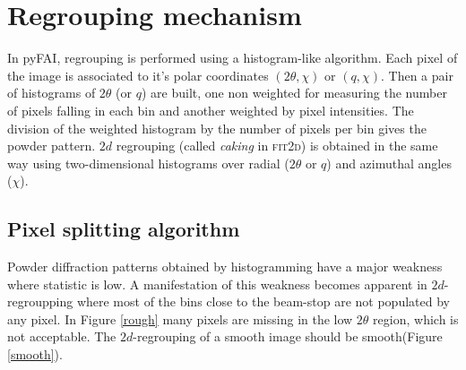 \documentclass[a4paper]{jpconf}
\begin{document}
\section{Regrouping mechanism}
In pyFAI, regrouping is performed using a histogram-like algorithm. 
Each pixel of the image is associated to it's polar coordinates
$(2\theta , \chi )$ or $(q, \chi )$. Then a pair of histograms of $2\theta$
(or $q$) are built, one non weighted for measuring the number of pixels falling in each bin and
another weighted by pixel intensities.
The division of the weighted histogram by the number of pixels per bin gives
the powder pattern.
$2d$ regrouping (called \textit{caking} in \textsc{fit2d}) is obtained in the
same way using two-dimensional histograms over radial ($2\theta$ or $q$) and azimuthal angles
($\chi$).

\subsection{Pixel splitting algorithm}
Powder diffraction patterns obtained by histogramming have a major weakness where
statistic is low.
A manifestation of this weakness becomes apparent in $2d$-regroupping where most of
the bins close to the beam-stop are not populated by any pixel.
In Figure \ref{rough} many pixels are missing in the low $2\theta$ region,
which is not acceptable. 
The  $2d$-regrouping of a smooth image should be smooth(Figure \ref{smooth}).
\end{document}
